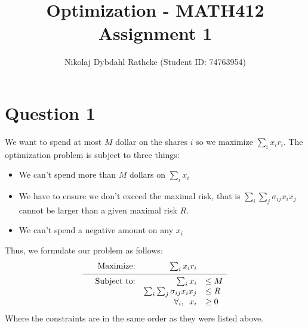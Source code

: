 \documentclass[a4paper, fleqn]{article}
\author{Nikolaj Dybdahl Rathcke (Student ID: 74763954)}
\title{Optimization - MATH412 \\ Assignment 1}
\newcommand\vgap{\noalign{\vskip 0.1cm}}
\begin{document}
\maketitle

\section{Question 1}
We want to spend at most $M$ dollar on the shares $i$ so we maximize $\sum_i x_ir_i$. The optimization problem is subject to three things:
\begin{itemize}
  \item We can't spend more than $M$ dollars on $\sum_i x_i$
  \item We have to ensure we don't exceed the maximal risk, that is $\sum_i \sum_j \sigma_{ij}x_ix_j$ cannot be larger than a given maximal risk $R$.
  \item We can't spend a negative amount on any $x_i$
\end{itemize}
Thus, we formulate our problem as follows:
\begin{equation}
  \begin{array}{rrrl}
    &\text{Maximize:}   & \sum_i x_ir_i  & \\
    \vgap
    \hline
    \vgap
    &\text{Subject to:} & \sum_i x_i & \leq M \\
    &                   & \sum_i \sum_j \sigma_{ij}x_ix_j &\leq R \\
    &                   & \forall_i\text{,}\ \ x_i & \geq 0
  \end{array}
\end{equation}
Where the constraints are in the same order as they were listed above.
\end{document}
